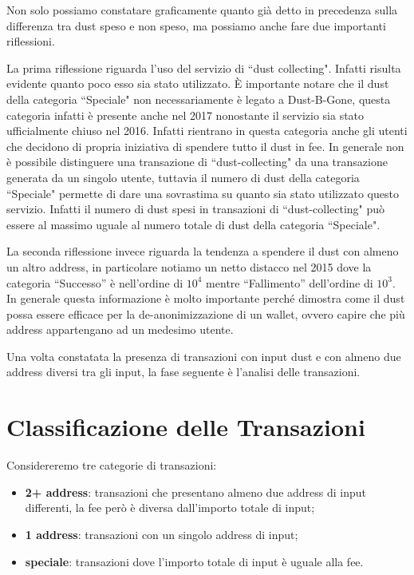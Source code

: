 Non solo possiamo constatare graficamente quanto già detto in precedenza sulla differenza tra dust speso e non speso, ma possiamo anche fare due importanti riflessioni. 

La prima riflessione riguarda l'uso del servizio di ``dust collecting". Infatti risulta evidente quanto poco esso sia stato utilizzato. È importante notare che il dust della categoria ``Speciale" non necessariamente è legato a Dust-B-Gone, questa categoria infatti è presente anche nel 2017 nonostante il servizio sia stato ufficialmente chiuso nel 2016. Infatti rientrano in questa categoria anche gli utenti che decidono di propria iniziativa di spendere tutto il dust in fee. In generale non è possibile distinguere una transazione di ``dust-collecting" da una transazione generata da un singolo utente, tuttavia il numero di dust della categoria ``Speciale" permette di dare una sovrastima su quanto sia stato utilizzato questo servizio. Infatti il numero di dust spesi in transazioni di ``dust-collecting" può essere al massimo uguale al numero totale di dust della categoria ``Speciale".  

La seconda riflessione invece riguarda la tendenza a spendere il dust con almeno un altro address, in particolare notiamo un netto distacco nel 2015 dove la categoria ``Successo'' è nell’ordine di $10^4$ mentre ``Fallimento'' dell’ordine di $10^3$. In generale questa informazione è molto importante perché dimostra come il dust possa essere efficace per la de-anonimizzazione di un wallet, ovvero capire che più address appartengano ad un medesimo utente.

Una volta constatata la presenza di transazioni con input dust e con almeno due address diversi tra gli input, la fase seguente è l'analisi delle transazioni.

\section{Classificazione delle Transazioni}
Considereremo tre categorie di transazioni: 
\begin{itemize}
    \item \textbf{2+ address}: transazioni che presentano almeno due address di input differenti, la fee però è diversa dall'importo totale di input;
    \item \textbf{1 address}: transazioni con un singolo address di input;
    \item \textbf{speciale}: transazioni dove l'importo totale di input è uguale alla fee.
\end{itemize}

